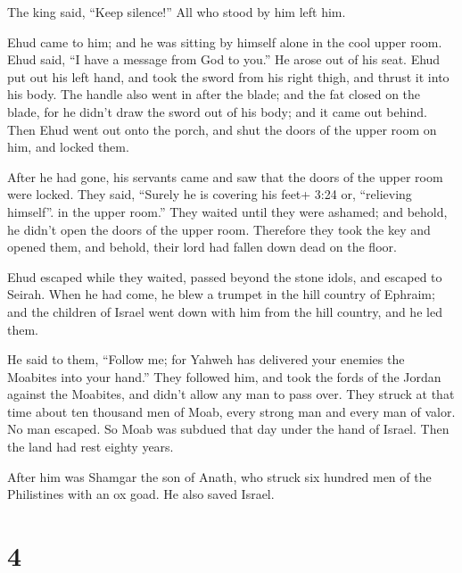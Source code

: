 The king said, ``Keep silence!'' All who stood by him left him.

 Ehud came to him; and he was sitting by himself alone in
the cool upper room. Ehud said, ``I have a message from God to you.'' He
arose out of his seat.  Ehud put out his left hand, and
took the sword from his right thigh, and thrust it into his body.
 The handle also went in after the blade; and the fat
closed on the blade, for he didn't draw the sword out of his body; and
it came out behind.  Then Ehud went out onto the porch, and
shut the doors of the upper room on him, and locked them.

 After he had gone, his servants came and saw that the
doors of the upper room were locked. They said, ``Surely he is covering
his feet+ 3:24 or, ``relieving himself''. in the upper room.''
 They waited until they were ashamed; and behold, he didn't
open the doors of the upper room. Therefore they took the key and opened
them, and behold, their lord had fallen down dead on the floor.

 Ehud escaped while they waited, passed beyond the stone
idols, and escaped to Seirah.  When he had come, he blew a
trumpet in the hill country of Ephraim; and the children of Israel went
down with him from the hill country, and he led them.

 He said to them, ``Follow me; for Yahweh has delivered
your enemies the Moabites into your hand.'' They followed him, and took
the fords of the Jordan against the Moabites, and didn't allow any man
to pass over.  They struck at that time about ten thousand
men of Moab, every strong man and every man of valor. No man escaped.
 So Moab was subdued that day under the hand of Israel.
Then the land had rest eighty years.

 After him was Shamgar the son of Anath, who struck six
hundred men of the Philistines with an ox goad. He also saved Israel.

\hypertarget{section-3}{%
\section{4}\label{section-3}}

